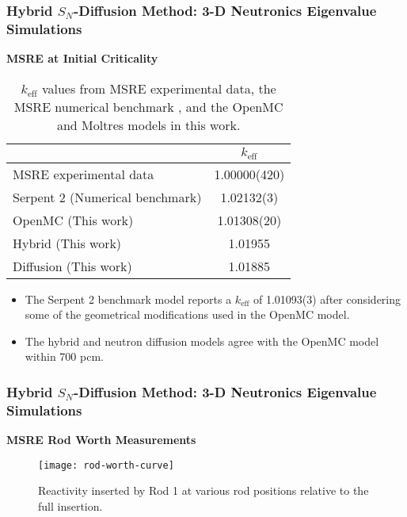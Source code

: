 \begin{frame}
  \frametitle{Hybrid $S_N$-Diffusion Method: 3-D Neutronics Eigenvalue Simulations}
  \textbf{MSRE at Initial Criticality}
  \begin{table}[htb]
    \centering
    \caption{$k_\text{eff}$ values from \gls{MSRE} experimental data, the \gls{MSRE} numerical
    benchmark \cite{fratoni_molten_2020}, and the OpenMC and Moltres models in this work.}
    \begin{tabular}{l S[table-format=1.5(2)]}
      \toprule
       & {$k_\text{eff}$} \\
       \midrule
      \gls{MSRE} experimental data & 1.00000(420) \\
      Serpent 2 (Numerical benchmark) & 1.02132(3) \\
      OpenMC (This work) & 1.01308(20) \\
      Hybrid (This work) & 1.01955 \\
      Diffusion (This work) & 1.01885 \\
      \bottomrule
    \end{tabular}
    \label{table:initial-crit}
  \end{table}

  \begin{itemize}
    \item The Serpent 2 benchmark model reports a $k_\text{eff}$ of 1.01093(3) after considering some
      of the geometrical modifications used in the OpenMC model.
    \item The hybrid and neutron diffusion models agree with the OpenMC model within 700 pcm.
  \end{itemize}
\end{frame}

\begin{frame}
  \frametitle{Hybrid $S_N$-Diffusion Method: 3-D Neutronics Eigenvalue Simulations}
  \textbf{MSRE Rod Worth Measurements}
  \begin{figure}[t]
    \centering
    \texttt{[image: rod-worth-curve]}
    \caption{Reactivity inserted by Rod 1 at various rod positions relative to the full insertion.}
    \label{fig:rod-worth}
  \end{figure}
\end{frame}

